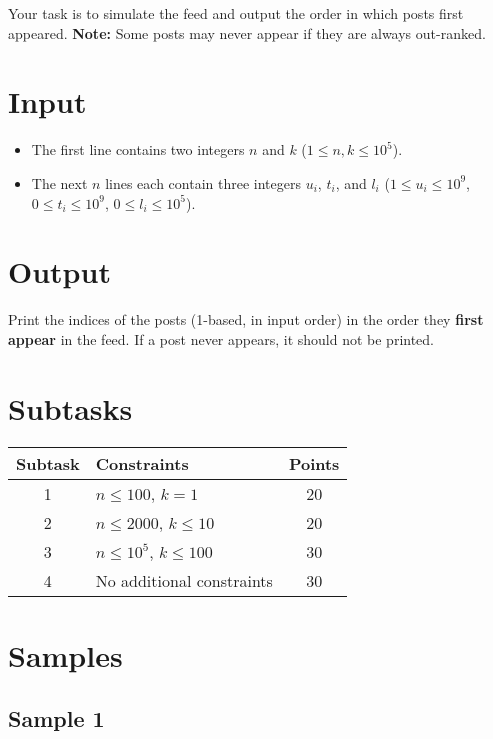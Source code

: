 \documentclass[12pt,a4paper]{article}
\begin{document}
Your task is to simulate the feed and output the order in which posts first appeared.  
\textbf{Note:} Some posts may never appear if they are always out-ranked.

\section*{Input}
\begin{itemize}
    \item The first line contains two integers $n$ and $k$ ($1 \leq n, k \leq 10^5$).  
    \item The next $n$ lines each contain three integers $u_i$, $t_i$, and $l_i$ ($1 \leq u_i \leq 10^9$, $0 \leq t_i \leq 10^9$, $0 \leq l_i \leq 10^5$).  
\end{itemize}

\section*{Output}
Print the indices of the posts (1-based, in input order) in the order they \textbf{first appear} in the feed.  
If a post never appears, it should not be printed.

\section*{Subtasks}
\begin{center}
\begin{tabularx}{\textwidth}{|c|X|c|}
\hline
\textbf{Subtask} & \textbf{Constraints} & \textbf{Points} \\
\hline
1 & $n \leq 100$, $k = 1$ & 20 \\
\hline
2 & $n \leq 2000$, $k \leq 10$ & 20 \\
\hline
3 & $n \leq 10^5$, $k \leq 100$ & 30 \\
\hline
4 & No additional constraints & 30 \\
\hline
\end{tabularx}
\end{center}

\section*{Samples}

\subsection*{Sample 1}
\end{document}
